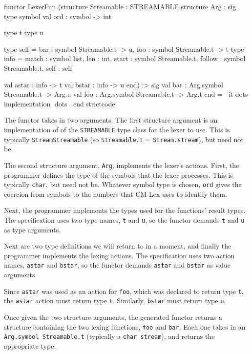 \documentclass[10pt]{article}
\begin{document}
\begin{strictcode}
functor LexerFun
   (structure Streamable : STREAMABLE
    structure Arg :
       sig
          type symbol
          val ord : symbol -> int

          type t
          type u

          type self = { bar : symbol Streamable.t -> u,
                        foo : symbol Streamable.t -> t }
          type info = { match : symbol list,
                        len : int,
                        start : symbol Streamable.t,
                        follow : symbol Streamable.t,
                        self : self }

          val astar : info -> t
          val bstar : info -> u
       end)
   :>
   sig
      val bar : Arg.symbol Streamable.t -> Arg.u
      val foo : Arg.symbol Streamable.t -> Arg.t
   end
= itdots implementation dots
endstrictcode


The functor takes in two arguments.  The first structure argument is
an implementation of of the {\tt STREAMABLE} type class for the lexer to
use.  This is typically {\tt StreamStreamable} (so {\tt Streamable.t} =
{\tt Stream.stream}), but need not be.

The second structure argument, {\tt Arg}, implements the lexer's
actions.  First, the programmer defines the type of the symbols that
the lexer processes.  This is typically {\tt char}, but need not be.
Whatever symbol type is chosen, {\tt ord} gives the coercion from
symbols to the numbers that CM-Lex uses to identify them.

Next, the programmer implements the types used for the functions'
result types.  The specification uses two type names, {\tt t} and {\tt u}, so
the functor demands {\tt t} and {\tt u} as type arguments.

Next are two type definitions we will return to in a moment, and
finally the programmer implements the lexing actions.  The
specification uses two action names, {\tt astar} and {\tt bstar}, so the 
functor demands {\tt astar} and {\tt bstar} as value arguments.

Since {\tt astar} was used as an action for {\tt foo}, which was declared to
return type {\tt t}, the {\tt astar} action must return type {\tt t}.  Similarly,
{\tt bstar} must return type {\tt u}.

Once given the two structure arguments, the generated functor returns
a structure containing the two lexing functions, {\tt foo} and {\tt bar}.
Each one takes in an {\tt Arg.symbol Streamable.t} (typically a {\tt char
stream}), and returns the appropriate type.


\end{strictcode}
\end{document}
